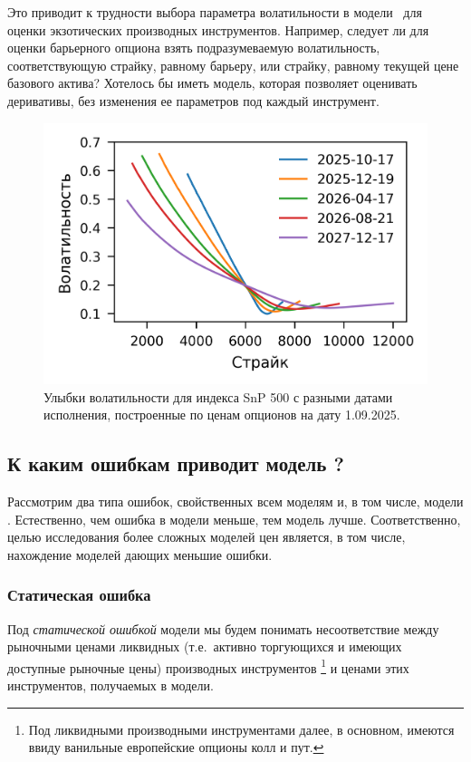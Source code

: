 Это приводит к трудности выбора параметра волатильности в модели \bs\ для оценки экзотических производных инструментов.
Например, следует ли для оценки барьерного опциона взять подразумеваемую волатильность, соответствующую страйку, равному барьеру, или страйку, равному текущей цене базового актива?
Хотелось бы иметь модель, которая позволяет оценивать деривативы, без изменения ее параметров под каждый инструмент.

\begin{figure}[t]
\includegraphics{pic/snp-smiles.png}
\centering
\caption{Улыбки волатильности для индекса SnP 500 с разными датами исполнения, построенные по ценам опционов на дату 1.09.2025.}
\label{intro:f:smiles}
\end{figure}


\subsection{К каким ошибкам приводит модель \bs?}

Рассмотрим два типа ошибок, свойственных всем моделям и, в том числе, модели \bs.
Естественно, чем ошибка в модели меньше, тем модель лучше.
Соответственно, целью исследования более сложных моделей цен является, в том числе, нахождение моделей дающих меньшие ошибки.

\subsubsection{Статическая ошибка}
Под \emph{статической ошибкой} модели мы будем понимать несоответствие между рыночными ценами ликвидных (т.е.\ активно торгующихся и имеющих доступные рыночные цены) производных инструментов%
\footnote{Под ликвидными производными инструментами далее, в основном, имеются ввиду ванильные европейские опционы колл и пут.}
и ценами этих инструментов, получаемых в модели.

